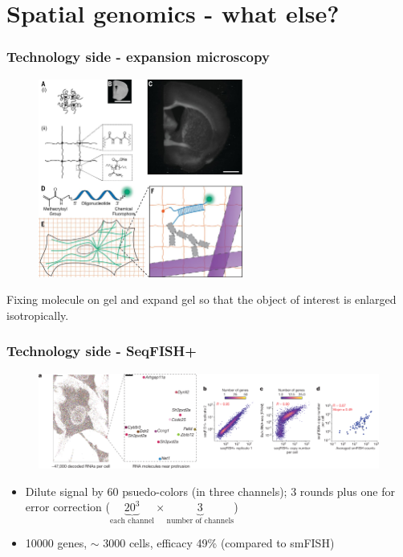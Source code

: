\documentclass{beamer}
\begin{document}
\section{Spatial genomics - what else?}

  \begin{frame}
  \frametitle{Technology side - expansion microscopy}
  \begin{figure}
    \centering
    \includegraphics[width=0.6\textwidth]{expansion}
    \cite{chen2015expansion}
  \end{figure}
  Fixing molecule on gel and expand gel so that the object of interest is enlarged isotropically.
  \end{frame}

  \begin{frame}
  \frametitle{Technology side - SeqFISH+}
  \begin{figure}
    \centering
    \includegraphics[width=\textwidth]{seqfishp}
    \cite{eng2019transcriptome}
  \end{figure}
  \begin{itemize}
    \item Dilute signal by 60 psuedo-colors (in three channels); 3 rounds plus one for error correction ($\underbrace{20^3}_{\text{each channel}} \times \underbrace{3}_{\text{number of channels}}$)
    \item 10000 genes, $\sim$ 3000 cells, efficacy 49\% (compared to smFISH)
  \end{itemize}
  \end{frame}
\end{document}
